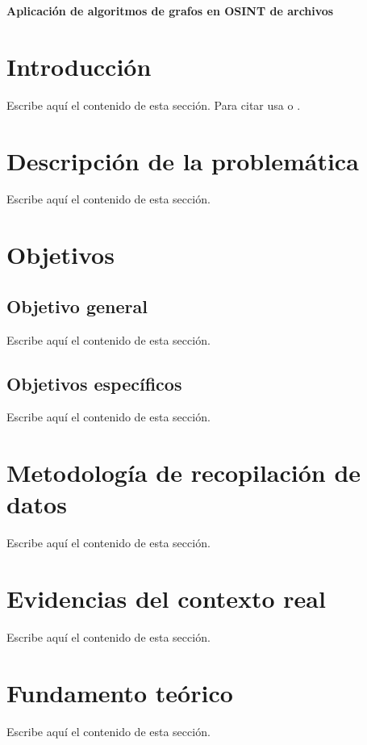 \documentclass[11pt,letterpaper]{article}
\newcommand{\titulo}{Aplicación de algoritmos de grafos en OSINT de archivos}
\begin{document}


\begin{singlespace}
  \tableofcontents
\end{singlespace}
\clearpage

\begin{center}\textbf{\titulo}\end{center}

\section{Introducción}
Escribe aquí el contenido de esta sección. Para citar usa
\parencite{cormen2022} o \textcite{dijkstra1959}.

\section{Descripción de la problemática}
Escribe aquí el contenido de esta sección.

\section{Objetivos}
\subsection{Objetivo general}
Escribe aquí el contenido de esta sección.
\subsection{Objetivos específicos}
Escribe aquí el contenido de esta sección.

\section{Metodología de recopilación de datos}
Escribe aquí el contenido de esta sección.

\section{Evidencias del contexto real}
Escribe aquí el contenido de esta sección.

\section{Fundamento teórico}
Escribe aquí el contenido de esta sección.
\end{document}
